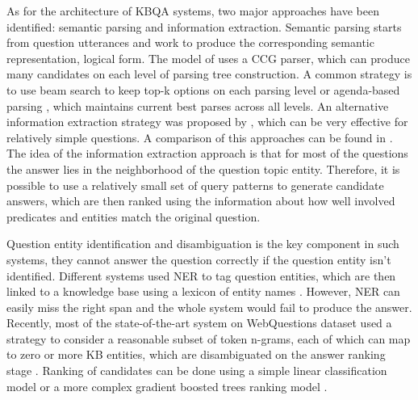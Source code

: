 As for the architecture of KBQA systems, two major approaches have been identified: semantic parsing and information extraction.
Semantic parsing starts from question utterances and work to produce the corresponding semantic representation, \eg logical form.
The model of \cite{BerantCFL13:sempre} uses a CCG parser, which can produce many candidates on each level of parsing tree construction.
A common strategy is to use beam search to keep top-k options on each parsing level or agenda-based parsing \cite{berant2015imitation}, which maintains current best parses across all levels.
An alternative information extraction strategy was proposed by \cite{YaoD14}, which can be very effective for relatively simple questions.
A comparison of this approaches can be found in \cite{yao2014freebase}.
The idea of the information extraction approach is that for most of the questions the answer lies in the neighborhood of the question topic entity.
Therefore, it is possible to use a relatively small set of query patterns to generate candidate answers, which are then ranked using the information about how well involved predicates and entities match the original question.

Question entity identification and disambiguation is the key component in such systems, they cannot answer the question correctly if the question entity isn't identified.
Different systems used NER to tag question entities, which are then linked to a knowledge base using a lexicon of entity names \cite{BerantCFL13:sempre,BerantL14:parasempre,xu2014answering}.
However, NER can easily miss the right span and the whole system would fail to produce the answer.
Recently, most of the state-of-the-art system on WebQuestions dataset used a strategy to consider a reasonable subset of token n-grams, each of which can map to zero or more KB entities, which are disambiguated on the answer ranking stage \cite{yao-scratch-qa-naacl2015,bastmore:cikm:2015:aquu,yih:ACL:2015:STAGG}.
Ranking of candidates can be done using a simple linear classification model \cite{yao-scratch-qa-naacl2015} or a more complex gradient boosted trees ranking model \cite{bastmore:cikm:2015:aquu,yih:ACL:2015:STAGG}.

